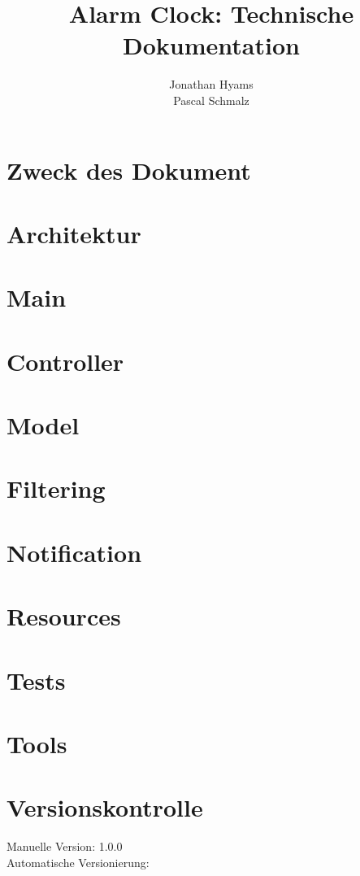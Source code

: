 \documentclass[11pt,titelpage]{scrartcl}
\title{Alarm Clock: Technische Dokumentation }
\author{Jonathan Hyams \\Pascal Schmalz}
\begin{document}
\thispagestyle{empty}
\maketitle
\pagebreak
\tableofcontents

\pagestyle{fancy}


\begin{abstract}
\end{abstract}
\pagebreak

\section{Zweck des Dokument}
%
\section{Architektur}

\section{Main}

\section{Controller}

\section{Model}

\section{Filtering}

\section{Notification}

\section{Resources}

\section{Tests}

\section{Tools}


\section{Versionskontrolle}
Manuelle Version: 1.0.0
\\

\noindent
Automatische Versionierung:
\immediate{}

\immediate{}
\end{document}
